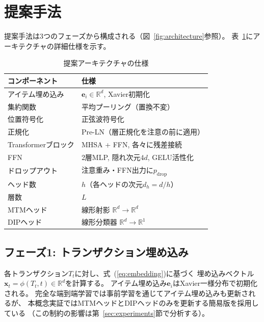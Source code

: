 \documentclass[sigconf,nonacm]{acmart}
\begin{document}
\section{提案手法}
\label{sec:method}

提案手法は3つのフェーズから構成される（図~\ref{fig:architecture}参照）。
表~\ref{tab:architecture}にアーキテクチャの詳細仕様を示す。

\begin{table}[t]
\centering
\caption{提案アーキテクチャの仕様}
\label{tab:architecture}
\begin{tabular}{ll}
\toprule
コンポーネント & 仕様 \\
\midrule
アイテム埋め込み & $\mathbf{e}_i \in \mathbb{R}^d$, Xavier初期化 \\
集約関数 & 平均プーリング（置換不変） \\
位置符号化 & 正弦波符号化~\cite{vaswani2017attention} \\
正規化 & Pre-LN（層正規化を注意の前に適用） \\
Transformerブロック & MHSA + FFN, 各々に残差接続 \\
FFN & 2層MLP, 隠れ次元$4d$, GELU活性化 \\
ドロップアウト & 注意重み・FFN出力に$p_{\text{drop}}$ \\
ヘッド数 & $h$（各ヘッドの次元$d_h = d/h$） \\
層数 & $L$ \\
MTMヘッド & 線形射影 $\mathbb{R}^d \to \mathbb{R}^d$ \\
DIPヘッド & 線形分類器 $\mathbb{R}^d \to \mathbb{R}^1$ \\
\bottomrule
\end{tabular}
\end{table}

\subsection{フェーズ1: トランザクション埋め込み}

各トランザクション$T_t$に対し、式~(\ref{eq:embedding})に基づく
埋め込みベクトル$\mathbf{x}_t = \phi(T_t, t) \in \mathbb{R}^d$を計算する。
アイテム埋め込み$\mathbf{e}_i$はXavier一様分布で初期化される。
完全な端到端学習では事前学習を通じてアイテム埋め込みも更新されるが、
本概念実証ではMTMヘッドとDIPヘッドのみを更新する簡易版を採用している
（この制約の影響は第~\ref{sec:experiments}節で分析する）。
\end{document}
